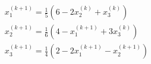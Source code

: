 \documentclass[preview]{standalone}
\begin{document}
\begin{align*}
x_1^{(k+1)} = \frac{1}{5} \left( 6 - 2 x_2^{(k)} + x_3^{(k)} \right) \\x_2^{(k+1)} = \frac{1}{6} \left( 4 - x_1^{(k+1)} + 3 x_3^{(k)} \right) \\x_3^{(k+1)} = \frac{1}{4} \left( 2 - 2 x_1^{(k+1)} - x_2^{(k+1)} \right)
\end{align*}
\end{document}
